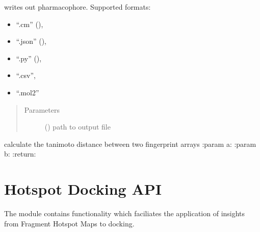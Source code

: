 \documentclass[letterpaper,10pt,english]{sphinxmanual}
\begin{document}
\begin{fulllineitems}
\begin{fulllineitems}
\label{\detokenize{hs_pharmacophore_api:hotspots.hs_pharmacophore.PharmacophoreModel.write}}
writes out pharmacophore. Supported formats:
\begin{itemize}
\item {} 
“.cm” (),

\item {} 
“.json” (),

\item {} 
“.py” (),

\item {} 
“.csv”,

\item {} 
“.mol2”

\end{itemize}
\begin{quote}\begin{description}
\item[{Parameters}] \leavevmode
{} () \textendash{} path to output file

\end{description}\end{quote}

\end{fulllineitems}


\end{fulllineitems}


\begin{fulllineitems}
\label{\detokenize{hs_pharmacophore_api:hotspots.hs_pharmacophore.tanimoto_dist}}
calculate the tanimoto distance between two fingerprint arrays
:param a:
:param b:
:return:

\end{fulllineitems}



\chapter{Hotspot Docking API}
\label{\detokenize{hs_docking_api:module-hotspots.hs_docking}}\label{\detokenize{hs_docking_api:hotspot-docking-api}}\label{\detokenize{hs_docking_api::doc}}
The {\hyperref[\detokenize{hs_docking_api:module-hotspots.hs_docking}]{}} module contains functionality which
faciliates the  application of insights from Fragment
Hotspot Maps to docking.
\end{document}
